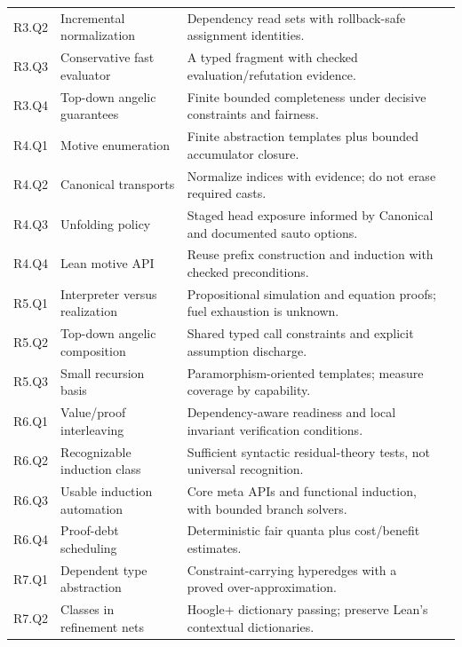 \begin{longtable}{@{}L{17mm}L{43mm}L{82mm}r@{}}
R3.Q2 & Incremental normalization & Dependency read sets with rollback-safe assignment identities. & \pageref{q:R3.Q2}\\[4pt]
R3.Q3 & Conservative fast evaluator & A typed fragment with checked evaluation/refutation evidence. & \pageref{q:R3.Q3}\\[4pt]
R3.Q4 & Top-down angelic guarantees & Finite bounded completeness under decisive constraints and fairness. & \pageref{q:R3.Q4}\\[4pt]
R4.Q1 & Motive enumeration & Finite abstraction templates plus bounded accumulator closure. & \pageref{q:R4.Q1}\\[4pt]
R4.Q2 & Canonical transports & Normalize indices with evidence; do not erase required casts. & \pageref{q:R4.Q2}\\[4pt]
R4.Q3 & Unfolding policy & Staged head exposure informed by Canonical and documented sauto options. & \pageref{q:R4.Q3}\\[4pt]
R4.Q4 & Lean motive API & Reuse prefix construction and induction with checked preconditions. & \pageref{q:R4.Q4}\\[4pt]
R5.Q1 & Interpreter versus realization & Propositional simulation and equation proofs; fuel exhaustion is unknown. & \pageref{q:R5.Q1}\\[4pt]
R5.Q2 & Top-down angelic composition & Shared typed call constraints and explicit assumption discharge. & \pageref{q:R5.Q2}\\[4pt]
R5.Q3 & Small recursion basis & Paramorphism-oriented templates; measure coverage by capability. & \pageref{q:R5.Q3}\\[4pt]
R6.Q1 & Value/proof interleaving & Dependency-aware readiness and local invariant verification conditions. & \pageref{q:R6.Q1}\\[4pt]
R6.Q2 & Recognizable induction class & Sufficient syntactic residual-theory tests, not universal recognition. & \pageref{q:R6.Q2}\\[4pt]
R6.Q3 & Usable induction automation & Core meta APIs and functional induction, with bounded branch solvers. & \pageref{q:R6.Q3}\\[4pt]
R6.Q4 & Proof-debt scheduling & Deterministic fair quanta plus cost/benefit estimates. & \pageref{q:R6.Q4}\\[4pt]
R7.Q1 & Dependent type abstraction & Constraint-carrying hyperedges with a proved over-approximation. & \pageref{q:R7.Q1}\\[4pt]
R7.Q2 & Classes in refinement nets & Hoogle+ dictionary passing; preserve Lean's contextual dictionaries. & \pageref{q:R7.Q2}\\[4pt]

\end{longtable}
